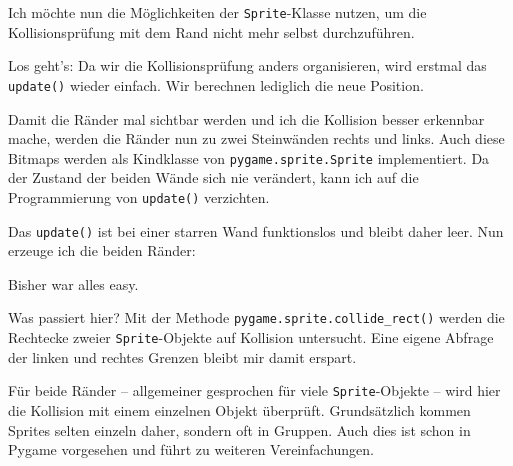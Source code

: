 Ich möchte nun die Möglichkeiten der \texttt{Sprite}-Klasse nutzen, um die Kollisionsprüfung mit dem Rand nicht mehr selbst durchzuführen. 


Los geht's: Da wir die Kollisionsprüfung anders organisieren, wird erstmal das \texttt{update()} wieder einfach. Wir berechnen lediglich die neue Position. 




Damit die Ränder mal sichtbar werden und ich die Kollision besser erkennbar mache, werden die Ränder nun zu zwei Steinwänden rechts und links. Auch diese Bitmaps werden als Kindklasse von \texttt{pygame.sprite.Sprite} implementiert. Da der Zustand der beiden Wände sich nie verändert, kann ich auf die Programmierung von \texttt{update()} verzichten.


Das \texttt{update()} ist bei einer starren Wand funktionslos und bleibt daher leer. Nun erzeuge ich die beiden Ränder:


Bisher war alles easy. 


Was passiert hier? Mit der Methode \texttt{pygame.sprite.collide\_rect()} werden die Rechtecke zweier \texttt{Sprite}-Objekte auf Kollision untersucht. Eine eigene Abfrage der linken und rechtes Grenzen bleibt mir damit erspart.

Für beide Ränder -- allgemeiner gesprochen für viele \texttt{Sprite}-Objekte -- wird hier die Kollision mit einem einzelnen Objekt überprüft. Grundsätzlich kommen Sprites selten einzeln daher, sondern oft in Gruppen. Auch dies ist schon in Pygame vorgesehen und führt zu weiteren Vereinfachungen.

